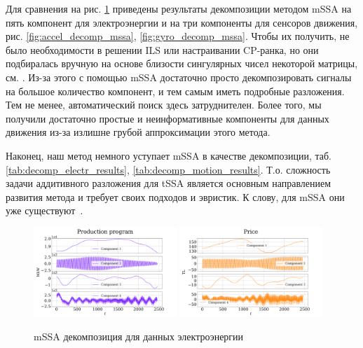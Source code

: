 			Для сравнения на рис. \ref{fig:electr_decomp_mssa} приведены результаты декомпозиции методом mSSA на пять компонент для электроэнергии и на три компоненты для сенсоров движения, рис. \ref{fig:accel_decomp_mssa}, \ref{fig:gyro_decomp_mssa}. Чтобы их получить, не было необходимости в решении ILS или настраивании CP-ранка, но они подбиралась вручную на основе близости сингулярных чисел некоторой матрицы, см. \cite{ecfb9dc578be43ae9ee8fc88b8ff9151}. Из-за этого с помощью mSSA достаточно просто декомпозировать сигналы на большое количество компонент, и тем самым иметь подробные разложения. Тем не менее, автоматический поиск здесь затруднителен. Более того, мы получили достаточно простые и неинформативные компоненты для данных движения из-за излишне грубой аппроксимации этого метода. 
			
			Наконец, наш метод немного уступает mSSA в качестве декомпозиции, таб. \ref{tab:decomp_electr_results}, \ref{tab:decomp_motion_results}. Т.о. сложность задачи аддитивного разложения для tSSA является основным направлением развития метода и требует своих подходов и эвристик. К слову, для mSSA они уже существуют~\cite{ecfb9dc578be43ae9ee8fc88b8ff9151}.
			
			\begin{figure}[h]
				\centering
				\includegraphics[width=0.48\textwidth, keepaspectratio]{../experiments/electricity/mssa/figs/decomposition/manual/grouping_1/Production_program.png}
				\includegraphics[width=0.48\textwidth, keepaspectratio]{../experiments/electricity/mssa/figs/decomposition/manual/grouping_1/Price.png}
				\caption{mSSA декомпозиция для данных электроэнергии}\label{fig:electr_decomp_mssa}
			\end{figure}
			
